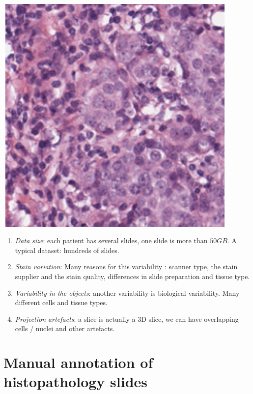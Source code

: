 \documentclass[a0,portrait]{a0poster}
\begin{document}
\begin{multicols}{2}
\begin{center}
   \includegraphics[height=12cm, width = 12cm]{histo3.png}
\end{center}

\begin{enumerate}
\item {\em Data size}: each patient has several slides, one slide is more than $50 GB$. A typical dataset: hundreds of slides. 

\item {\em Stain variation}: Many reasons for this variability : 
 scanner type, the stain supplier and
  the stain quality, differences in slide preparation and tissue
  type. 
\item {\em Variability in the objects}: another variability is biological variability. Many different cells and tissue types.
\item {\em Projection artefacts}: a slice is actually a 3D slice, we can have overlapping cells / nuclei
  and other artefacts.
\end{enumerate}

\section*{Manual annotation of histopathology slides}


\end{multicols}
\end{document}
